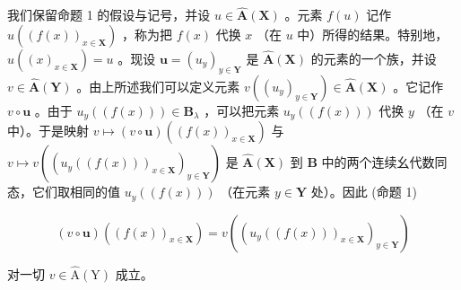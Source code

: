 我们保留命题 1 的假设与记号，并设 \(u \in \hat{\mathbf{A}}(\mathbf{X})\) 。元素 \(f(u)\) 记作 \(u((f(x))_{x \in \mathbf{X}})\) ，称为把 \(f(x)\) 代换 \(x\) （在 \(u\) 中）所得的结果。特别地， \(u((x)_{x \in \mathbf{X}}) = u\) 。现设 \(\boldsymbol{u} = (u_y)_{y \in \mathbf{Y}}\) 是 \(\hat{\mathbf{A}}(\mathbf{X})\) 的元素的一个族，并设 \(v \in \hat{\mathbf{A}}(\mathbf{Y})\) 。由上所述我们可以定义元素 \(v((u_y)_{y \in \mathbf{Y}}) \in \hat{\mathbf{A}}(\mathbf{X})\) 。它记作 \(v \circ \boldsymbol{u}\) 。由于 \(u_y((f(x))) \in \mathbf{B}_{\lambda}\) ，可以把元素 \(u_y((f(x)))\) 代换 \(y\) （在 \(v\) 中）。于是映射 \(v \mapsto (v \circ \boldsymbol{u})((f(x))_{x \in \mathbf{X}})\) 与 \(v \mapsto v((u_y((f(x)))_{x \in \mathbf{X}})_{y \in \mathbf{Y}})\) 是 \(\hat{\mathbf{A}}(\mathbf{X})\) 到 \(\mathbf{B}\) 中的两个连续幺代数同态，它们取相同的值 \(u_y((f(x)))\) （在元素 \(y \in \mathbf{Y}\) 处）。因此 (命题 1)

\[
(v \circ \boldsymbol {u}) ((f (x))_{x \in \mathbf{X}}) = v ((u _ {y} ((f (x)))_{x \in \mathbf{X}})_{y \in \mathbf{Y}})\tag{2}
\]

对一切 \(v \in \hat{\mathrm{A}}(\mathrm{Y})\) 成立。

